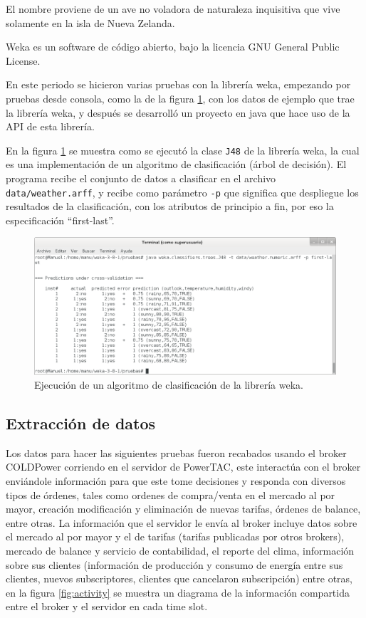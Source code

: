 El nombre proviene de un ave no voladora de naturaleza inquisitiva que vive solamente en la isla de Nueva Zelanda.

Weka es un software de código abierto, bajo la licencia GNU General Public License.

En este periodo se hicieron varias pruebas con la librería weka, empezando por pruebas desde consola, como la de la figura \ref{fig:ejecucionAlgoritmoClasificacion}, con los datos de ejemplo que trae la librería weka, y después se desarrolló un proyecto en java que hace uso de la API de esta librería.

En la figura \ref{fig:ejecucionAlgoritmoClasificacion} se muestra como se ejecutó la clase \texttt{J48} de la librería weka, la cual es una implementación de un algoritmo de clasificación (árbol de decisión). 
El programa recibe el conjunto de datos a clasificar en el archivo \texttt{data/weather.arff}, y recibe como parámetro \texttt{-p} que significa que despliegue los resultados de la clasificación, con los atributos de principio a fin, por eso la especificación ``first-last''.

\begin{figure}[h]
	\centering
	\includegraphics[width=13cm]{img/ejecucionAlgoritmoClasificacion.png}
	\caption{Ejecución de un algoritmo de clasificación de la librería weka.}
	\label{fig:ejecucionAlgoritmoClasificacion}
\end{figure}

\subsection{Extracción de datos} 
\label{subsec:extraccion}
Los datos para hacer las siguientes pruebas fueron recabados usando el broker COLDPower corriendo en el servidor de PowerTAC, este interactúa con el broker enviándole información para que este tome decisiones y responda con diversos tipos de órdenes, tales como ordenes de compra/venta en el mercado al por mayor, creación modificación y eliminación de nuevas tarifas, órdenes de balance, entre otras. La información que el servidor le envía al broker incluye datos sobre el mercado al por mayor y el de tarifas 
(tarifas publicadas por otros brokers), mercado de balance y servicio de contabilidad, el reporte del clima,
información sobre sus clientes (información de producción y consumo de energía entre sus clientes, nuevos subscriptores, clientes que cancelaron subscripción) entre otras, en la figura \ref{fig:activity} se muestra un diagrama de la información compartida entre el broker y el servidor en cada time slot.

